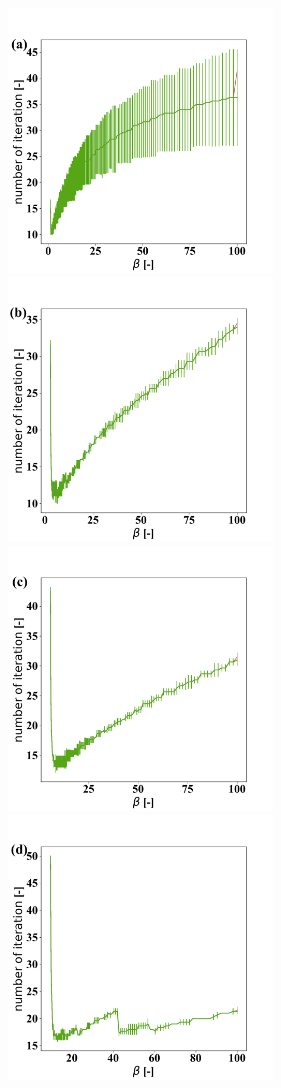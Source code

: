 \documentclass{article}
\begin{document}
\begin{figure}[h!]
   \centering
        \includegraphics[width=7.0cm, height=7.0cm]{pictures/ell_homo_diff_k_sipg_it_k1.pdf}
        \includegraphics[width=7.0cm, height=7.0cm]{pictures/ell_homo_diff_k_sipg_it_k2.pdf}
        \includegraphics[width=7.0cm, height=7.0cm]{pictures/ell_homo_diff_k_sipg_it_k3.pdf}
        \includegraphics[width=7.0cm, height=7.0cm]{pictures/ell_homo_diff_k_sipg_it_k4.pdf}

\end{figure}
\end{document}
